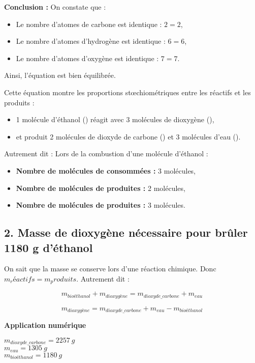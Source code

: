 \documentclass[a4paper,12pt]{article}
\begin{document}
\textbf{Conclusion :} On constate que :
\begin{itemize}
  \item Le nombre d'atomes de carbone est identique : \(2 = 2\),
  \item Le nombre d'atomes d'hydrogène est identique : \(6 = 6\),
  \item Le nombre d'atomes d'oxygène est identique : \(7 = 7\).
\end{itemize}

Ainsi, l'équation est bien équilibrée.


Cette équation montre les proportions stœchiométriques entre les réactifs et les produits :
\begin{itemize}
\item 1 molécule d'éthanol () réagit avec 3 molécules de dioxygène (),
\item et produit 2 molécules de dioxyde de carbone () et 3 molécules d'eau ().
\end{itemize}

Autrement dit : Lors de la combustion d'une molécule d'éthanol :
\begin{itemize}
    \item \textbf{Nombre de molécules de  consommées :} 3 molécules,
    \item \textbf{Nombre de molécules de  produites :} 2 molécules,
    \item \textbf{Nombre de molécules de  produites :} 3 molécules.
\end{itemize}

\subsection*{2. Masse de dioxygène nécessaire pour brûler 1180 g d'éthanol}

On sait que la masse se conserve lors d'une réaction chimique. Donc $m_réactifs = m_produits$. Autrement dit : 

\[
m_{bioéthanol} + m_{dioxygène} = m_{dioxyde\_carbone} + m_{eau}
\] 

\[
m_{dioxygène} = m_{dioxyde\_carbone} + m_{eau} - m_{bioéthanol}
\] 

\vspace{1em}
\textbf{Application numérique}
\vspace{1em}

$m_{dioxyde\_carbone} = \SI{2257}{g}$ \\
$m_{eau} = \SI{1305}{g}$ \\
$m_{bioéthanol} = \SI{1180}{g}$ \\
\end{document}
